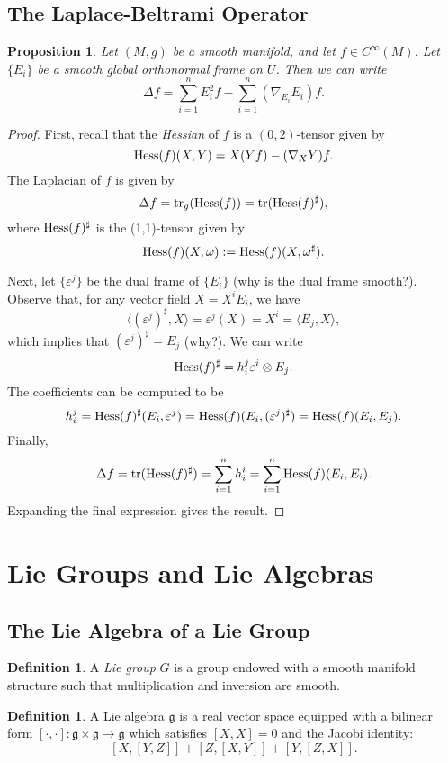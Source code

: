 \documentclass{amsart}[]
\newcommand{\why}{\color{red}(why?)\color{black}}
\newcommand{\alert}[1]{\color{red}#1\color{black}}
\newcommand{\hess}{\text{\normalfont Hess}}
\newcommand{\tr}{\text{\normalfont tr}}
\theoremstyle{plain}
\newtheorem{proposition}[theorem]{Proposition}
\theoremstyle{definition}
\newtheorem{definition}[theorem]{Definition}
\theoremstyle{remark}
\begin{document}
	\subsection{The Laplace-Beltrami Operator}
	\begin{proposition}
		\label{general_laplacian}
		Let $(M,g)$ be a smooth manifold, and let 
		$f \in C^\infty(M)$. Let $\{E_i\}$ be a smooth global orthonormal frame on $U$. Then we can write
		$$\Delta f = \sum_{i=1}^n E_i^2 f - \sum_{i=1}^n (\nabla_{E_i}E_i) f.$$
	\end{proposition}
	\begin{proof}
		First, recall that the \emph{Hessian} of $f$ is a $(0,2)$-tensor given by 
		$$\hess(f)(X,Y) = X(Yf) - (\nabla_X Y)f.$$
		The Laplacian of $f$ is given by 
		$$\Delta f = \tr_g(\hess(f)) = \tr(\hess(f)^\sharp),$$
		where  $\hess(f)^\sharp$ is the (1,1)-tensor given by
		$$\hess(f)(X, \omega) := \hess(f)(X, \omega^\sharp).$$
		
		Next, let $\{\varepsilon^j\}$ be the dual frame of $\{E_i\}$ \alert{(why is the dual frame smooth?)}. Observe that, for any vector field $X = X^i E_i$, we have 
		$$\langle( \varepsilon^j)^\sharp, X\rangle = \varepsilon^j(X) = X^i = \langle E_j, X\rangle,$$
		which implies that $(\varepsilon^j)^\sharp = E_j$ \why. We can write 
		$$\hess(f)^\sharp = h_{i}^j \varepsilon^i \otimes E_j.$$
		The coefficients can be computed to be 
		$$ h_{i}^j = \hess(f)^\sharp(E_i, \varepsilon^j) = \hess(f)(E_i, (\varepsilon^j)^\sharp) = \hess(f) (E_i, E_j).$$
		Finally, 
		$$\Delta f = \tr(\hess(f)^\sharp) = \sum_{i=1}^n h_i^i = \sum_{i=1}^n\hess(f) (E_i, E_i).$$
		Expanding the final expression gives the result.
	\end{proof}

\section{Lie Groups and Lie Algebras}
	\subsection{The Lie Algebra of a Lie Group}
	\begin{definition}
		A \emph{Lie group} $G$ is a group endowed with a smooth manifold structure such that multiplication and inversion are smooth. 
	\end{definition}
	
	\begin{definition}
		A Lie algebra $\mathfrak g$ is a real vector space equipped with a bilinear form $[\cdot,\cdot]:\mathfrak g \times  \mathfrak g \rightarrow \mathfrak g$ which satisfies $[X,X] = 0$ and the Jacobi identity:
		$$[X,[Y,Z]] + [Z,[X,Y]] + [Y,[Z,X]].$$
	\end{definition}
	
\end{document}
